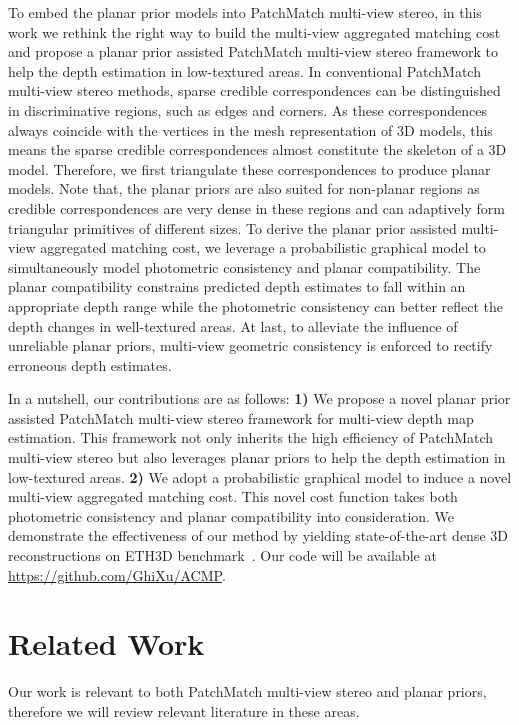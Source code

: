 \documentclass[letterpaper]{article} %
\begin{document}
To embed the planar prior models into PatchMatch multi-view stereo, in this work we rethink the right way to build the multi-view aggregated matching cost and propose a planar prior assisted PatchMatch multi-view stereo framework to help the depth estimation in low-textured areas. In conventional PatchMatch multi-view stereo methods,  sparse credible correspondences can be distinguished in discriminative regions, such as edges and corners. As these correspondences always coincide with the vertices in the mesh representation of 3D models, this means the sparse credible correspondences almost constitute the skeleton of a 3D model. Therefore, we first triangulate these correspondences to produce planar models. Note that, the planar priors are also suited for non-planar regions as credible correspondences are very dense in these regions and can adaptively form triangular primitives of different sizes. To derive the planar prior assisted multi-view aggregated matching cost, we leverage a probabilistic graphical model to simultaneously model photometric consistency and planar compatibility. The planar compatibility constrains predicted depth estimates to fall within an appropriate depth range while the photometric consistency can better reflect the depth changes in well-textured areas. At last, to alleviate the influence of unreliable planar priors, multi-view geometric consistency is enforced to rectify erroneous depth estimates.

In a nutshell, our contributions are as follows: {\bf 1)} We propose a novel planar prior assisted PatchMatch multi-view stereo framework for multi-view depth map estimation. This framework not only inherits the high efficiency of PatchMatch multi-view stereo but also leverages planar priors to help the depth estimation in low-textured areas. {\bf 2)} We adopt a probabilistic graphical model to induce a novel multi-view aggregated matching cost. This novel cost function takes both photometric consistency and planar compatibility into consideration. We demonstrate the effectiveness of our method by yielding state-of-the-art dense 3D reconstructions on ETH3D benchmark~\cite{Schops2017Multi}. Our code will be available at \url{https://github.com/GhiXu/ACMP}.

\section{Related Work}

Our work is relevant to both PatchMatch multi-view stereo and planar priors, therefore we will review relevant literature in these areas.
\end{document}
